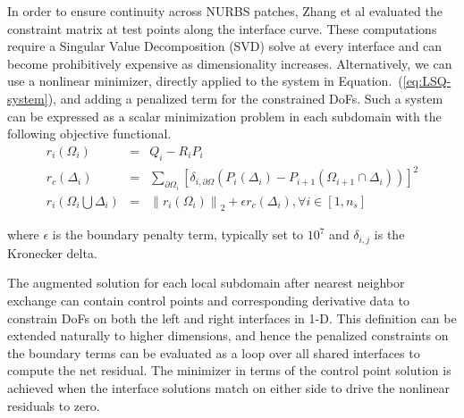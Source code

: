 \documentclass[conference]{IEEEtran}
\newcommand{\eqt}[1]{Equation.~(\ref{#1})}
\begin{document}
In order to ensure continuity across NURBS patches, Zhang et al  \cite{zhang-nurbs-continuity} evaluated the constraint matrix at test points along the interface curve. These computations require a Singular Value Decomposition (SVD) solve at every interface and can become prohibitively expensive as dimensionality increases. Alternatively, we can use a nonlinear minimizer, directly applied to the system in \eqt{eq:LSQ-system}, and adding a penalized term for the constrained DoFs. Such a system can be expressed as a scalar minimization problem in each subdomain with the following objective functional.
%
\begin{eqnarray}
r_i(\Omega_i) &=& Q_i - R_i P_i \nonumber \\
r_c(\Delta_{i})    &=& \sum_{\partial \Omega_i} \left[ \delta_{i,\partial \Omega} (P_i(\Delta_i) - P_{i+1}(\Omega_{i+1} \cap \Delta_{i} ))  \right]^2 \nonumber \\ 
r_i(\Omega_i \bigcup \Delta_{i}) &=& \left\lVert r_i(\Omega_i) \right\rVert_2 + \epsilon r_c(\Delta_{i}), \forall i \in [1, n_s]
\label{eq:nonlinear-residuals}
\end{eqnarray}

where $\epsilon$ is the boundary penalty term, typically set to $10^{7}$ and $\delta_{i,j}$ is the Kronecker delta.

The augmented solution for each local subdomain after nearest neighbor exchange can contain control points and corresponding derivative data to constrain DoFs on both the left and right interfaces in 1-D. This definition can be extended naturally to higher dimensions, and hence the penalized constraints on the boundary terms can be evaluated as a loop over all shared interfaces to compute the net residual. The minimizer in terms of the control point solution is achieved when the interface solutions match on either side to drive the nonlinear residuals to zero.
\end{document}
